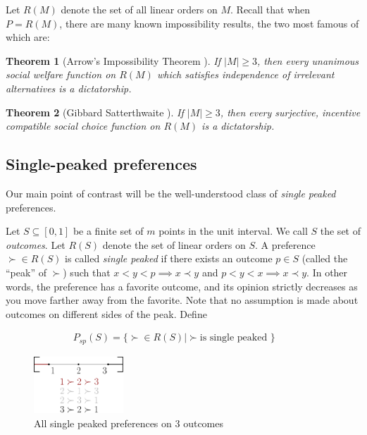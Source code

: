 \documentclass[12pt]{article}
\newtheorem{theorem}{Theorem}
\newcommand{\1}[1]{\mathds{1}[{#1}]}
\begin{document}
    Let $R(M)$ denote the set of all linear orders on $M$.
    Recall that when $P = R(M)$, there are many known impossibility results,
    the two most famous of which are:

    \begin{theorem}[Arrow's Impossibility Theorem \cite{AgtBookMechDesignInto}]
      If $|M| \ge 3$, then
      every unanimous social welfare function on $R(M)$
      which satisfies independence of irrelevant alternatives is a dictatorship.
    \end{theorem}

    \begin{theorem}[Gibbard Satterthwaite \cite{AgtBookMechDesignInto}]
      If $|M| \ge 3$, then
      every surjective, incentive compatible social choice function on $R(M)$
      is a dictatorship.
    \end{theorem}

  \subsection{Single-peaked preferences}
    Our main point of contrast will be the well-understood class of
    \emph{single peaked} preferences.

    Let $S\subseteq [0,1]$ be a finite set of $m$ points in the unit interval.
    We call $S$ the set of \emph{outcomes}.
    Let $R(S)$ denote the set of linear orders on $S$.
    A preference $\succ \in R(S)$ is called \emph{single peaked} if
    there exists an outcome $p\in S$ (called the ``peak'' of $\succ$)
    such that $x < y < p \implies x \prec y$ and $p < y < x \implies x \prec y$.
    In other words, the preference has a favorite outcome,
    and its opinion strictly decreases as you move farther away from the favorite.
    Note that no assumption is made about outcomes on different sides of the peak.
    Define

    \begin{align*}
      P_{sp}(S) = \{ \succ \in R(S) | \succ \text{is single peaked }\} && \ 
    \end{align*}
    \begin{figure}
      \vspace{-0.75in}
      \begin{center}
        \includegraphics[width=0.3\textwidth]{figures/defSP}
      \end{center}
      \caption{All single peaked preferences on $3$ outcomes}
      \label{fig:singlePeakedThree}
    \end{figure}
\end{document}
